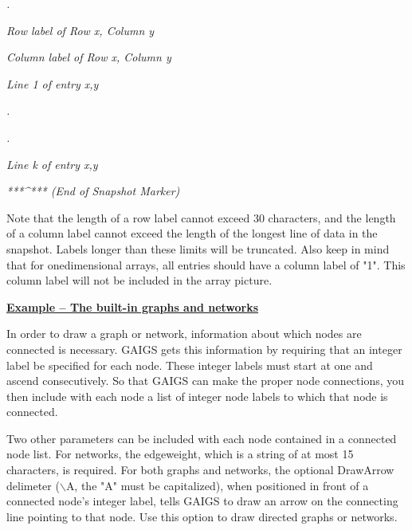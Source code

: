 \documentclass[12pt]{article}
\begin{document}
\textit{{\footnotesize{}                        .}}

\textit{{\footnotesize{}                Row label of Row x, Column y}}

\textit{{\footnotesize{}                Column label of Row x, Column y}}

\textit{{\footnotesize{}                Line  1 of entry x,y}}

\textit{{\footnotesize{}                        .}}

\textit{{\footnotesize{}                        .}}

\textit{{\footnotesize{}                Line k of entry x,y}}

\textit{{\footnotesize{}                ***\^{}***   (End of Snapshot Marker)}}



{\footnotesize{}Note that the length of a row label cannot exceed 30 characters, and the length of a column label cannot exceed the length of the longest line of data in the snapshot.  Labels longer than these limits will be truncated.  Also keep in mind that for onedimensional arrays, all entries should have a column label of "1".  This column label will not be included in the array picture.}



\begin{flushleft}
\textbf{\uline{{\footnotesize{}Example -- The built-in graphs and networks}}}\textbf{{\footnotesize{} }}
\end{flushleft}




{\footnotesize{}In order to draw a graph or network, information about which nodes are connected is necessary.   GAIGS gets this information by requiring that an integer label be specified for each node.   These integer labels must start at one and ascend consecutively.  So that GAIGS can make the proper node connections, you then include with each node a list of integer node labels to which that node is connected.}



{\footnotesize{}Two other parameters can be included with each node contained in a  connected node list.  For networks, the edgeweight, which is a string of at most 15 characters, is required.  For both graphs and networks, the optional DrawArrow delimeter (\ensuremath{\backslash}A, the "A" must be capitalized), when positioned in front of a connected node's integer label, tells GAIGS to draw an arrow on the connecting line pointing to that node. Use this option to draw directed graphs or networks.}
\end{document}

